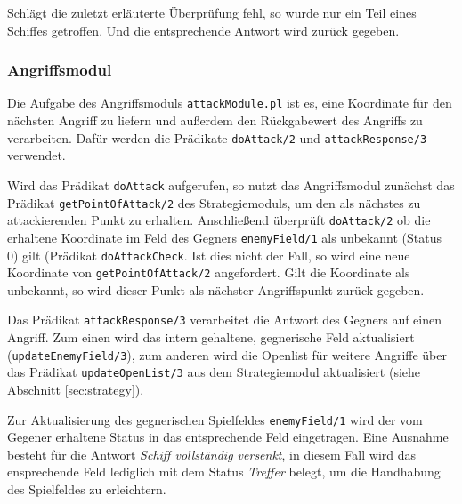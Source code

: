 	Schlägt die zuletzt erläuterte Überprüfung fehl, so wurde nur ein Teil eines Schiffes getroffen. Und die entsprechende Antwort wird zurück 
	gegeben.
	
	
\subsubsection{Angriffsmodul} \label{sec:attackModule}
	Die Aufgabe des Angriffsmoduls \texttt{attackModule.pl} ist es, eine Koordinate für den nächsten Angriff zu liefern und außerdem den 
	Rückgabewert des Angriffs zu verarbeiten. 
	Dafür werden die Prädikate \texttt{doAttack/2} und \texttt{attackResponse/3} verwendet. 
	
	Wird das Prädikat \texttt{doAttack} aufgerufen, so nutzt das Angriffsmodul zunächst das Prädikat \texttt{getPointOfAttack/2} des
	Strategiemoduls, um den als nächstes zu attackierenden Punkt zu erhalten. Anschließend überprüft \texttt{doAttack/2} 
	ob die erhaltene Koordinate im Feld des Gegners \texttt{enemyField/1} als unbekannt (Status 0) gilt (Prädikat \texttt{doAttackCheck}. 
	Ist dies nicht der Fall, so wird eine neue Koordinate von \texttt{getPointOfAttack/2} angefordert. 
	Gilt die Koordinate als unbekannt, so wird dieser Punkt als nächster Angriffspunkt zurück gegeben.
	
	Das Prädikat \texttt{attackResponse/3} verarbeitet die Antwort des Gegners auf einen Angriff. Zum einen wird das intern gehaltene, 
	gegnerische Feld aktualisiert (\texttt{updateEnemyField/3}), zum anderen wird die Openlist für weitere Angriffe über 
	das Prädikat \texttt{updateOpenList/3} aus dem Strategiemodul aktualisiert (siehe Abschnitt \ref{sec:strategy}).
	
	Zur Aktualisierung des gegnerischen Spielfeldes \texttt{enemyField/1} wird der vom Gegener erhaltene Status in das entsprechende 
	Feld eingetragen. Eine Ausnahme besteht für die Antwort \textit{Schiff vollständig versenkt}, in diesem Fall wird das ensprechende
	Feld lediglich mit dem Status \textit{Treffer} belegt, um die Handhabung des Spielfeldes zu erleichtern. 

	

	
